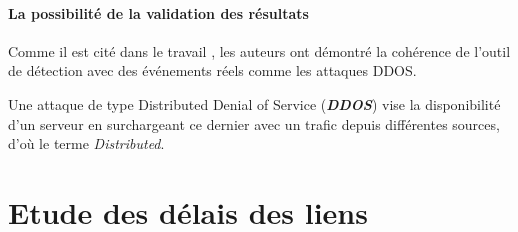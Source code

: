 \paragraph{La possibilité de la validation des résultats}  Comme il est cité dans le travail \cite{DBLP:journals/corr/FontugneAPB16}, les auteurs ont démontré la cohérence de l'outil de détection avec des événements réels comme les  attaques DDOS.
	\begin{tcolorbox}
		Une attaque de type Distributed Denial of Service (\textbf{\textit{DDOS}}) vise la disponibilité d'un serveur en surchargeant ce dernier avec un trafic depuis différentes sources, d'où le terme \textit{Distributed}.
	\end{tcolorbox}
	

\section{Etude des délais des liens } \label{outil-detection-details}

